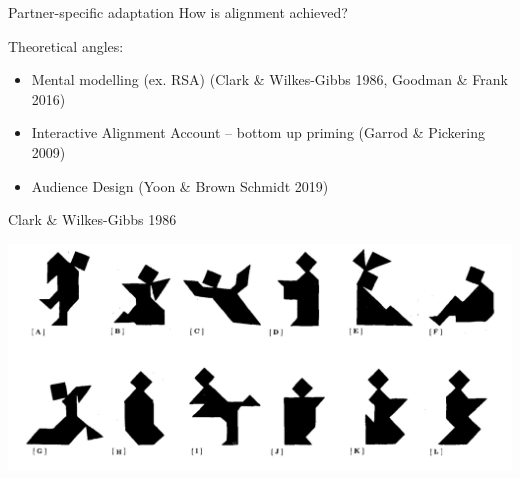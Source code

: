 \documentclass[ 12pt, xcolor=beamer,table,usenames,dvipsnames, ignorenonframetext, ngerman]{beamer}
\begin{document}
\begin{frame}{Partner-specific adaptation}
	\pause
	How is alignment achieved? 
	
	\pause
	Theoretical angles: \pause
	\begin{itemize} 
		\item Mental modelling (ex. RSA) (Clark \& Wilkes-Gibbs 1986, Goodman \& Frank 2016) \pause
		\item Interactive Alignment Account -- bottom up priming (Garrod \& Pickering 2009) \pause
		\item Audience Design (Yoon \& Brown Schmidt 2019)
	\end{itemize}
\end{frame}

%
\begin{frame}{Clark \& Wilkes-Gibbs 1986}
	
	\pause
	\vspace{-.2cm}
\begin{center}
	\includegraphics[width=.7\textwidth]{../images/clark_tangrams.png}
	\end{center}
\vspace{-.4cm}
\pause
\begin{small}
\begin{enumerate}
	\setlength{\itemsep}{-2pt}


\end{enumerate}
\end{small}
\end{frame}
\end{document}
